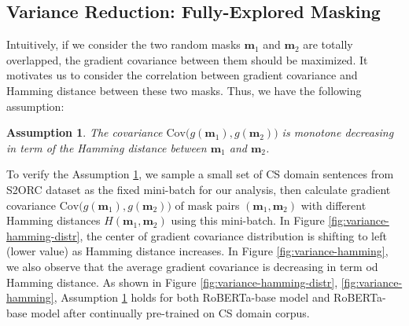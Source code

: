 \documentclass{article} \usepackage{iclr2021_conference,times}
\newcommand{\Cov}{\mathrm{Cov}}
\theoremstyle{plain}
\newtheorem{assumption}{Assumption}
\begin{document}
\subsection{Variance Reduction: Fully-Explored Masking}
\vspace{-2mm}










Intuitively, if we consider the two random masks $\mathbf{m}_1$ and $\mathbf{m}_2$ are totally overlapped, the gradient covariance between them should be maximized. It motivates us to consider the correlation between gradient covariance and Hamming distance between these two masks. Thus, we have the following assumption:
\begin{assumption}\label{asmp:cov-hamming}
	The covariance $\Cov\bigl(g(\mathbf{m}_1),g(\mathbf{m}_2)\bigr)$ is monotone decreasing in term of the Hamming distance between $\mathbf{m}_1$ and $\mathbf{m}_2$.
\end{assumption}



To verify the Assumption \ref{asmp:cov-hamming}, we sample a small set of CS domain sentences from S2ORC dataset \citep{gururangan2020don} as the fixed mini-batch for our analysis, then calculate gradient covariance $\Cov\bigl(g(\mathbf{m}_1),g(\mathbf{m}_2)\bigr)$ of mask pairs $(\mathbf{m}_1,\mathbf{m}_2)$ with different Hamming distances $H(\mathbf{m}_1,\mathbf{m}_2)$ using this mini-batch. In Figure \ref{fig:variance-hamming-distr}, the center of gradient covariance distribution is shifting to left (lower value) as Hamming distance increases. In Figure \ref{fig:variance-hamming}, we also observe that the average gradient covariance is decreasing in term od Hamming distance. As shown in Figure \ref{fig:variance-hamming-distr}, \ref{fig:variance-hamming}, Assumption \ref{asmp:cov-hamming} holds for both RoBERTa-base model \citep{liu2019roberta} and RoBERTa-base model after continually pre-trained on CS domain corpus.
\end{document}
